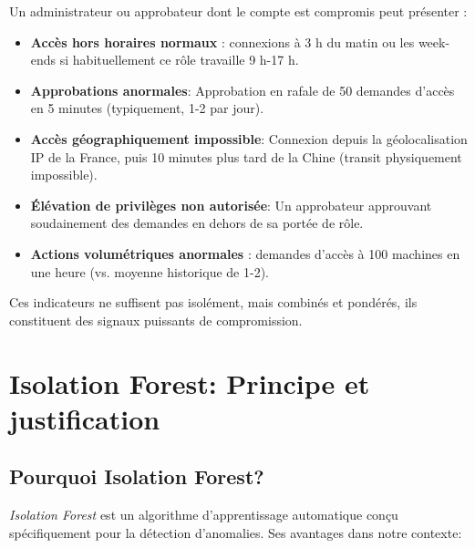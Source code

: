 Un administrateur ou approbateur dont le compte est compromis peut présenter :

\begin{itemize}
	\item \textbf{Accès hors horaires normaux} : connexions à 3 h du matin ou les week-ends si habituellement ce rôle travaille 9 h-17 h.
	
	\item \textbf{Approbations anormales}: Approbation en rafale de 50 demandes d'accès en 5 minutes (typiquement, 1-2 par jour).
	
	\item \textbf{Accès géographiquement impossible}: Connexion depuis la géolocalisation IP de la France, puis 10 minutes plus tard de la Chine (transit physiquement impossible).
	
	\item \textbf{Élévation de privilèges non autorisée}: Un approbateur approuvant soudainement des demandes en dehors de sa portée de rôle.
	
	\item \textbf{Actions volumétriques anormales} : demandes d'accès à 100 machines en une heure (vs. moyenne historique de 1-2).
\end{itemize}

Ces indicateurs ne suffisent pas isolément, mais combinés et pondérés, ils constituent des signaux puissants de compromission.

\section{Isolation Forest: Principe et justification}

\subsection{Pourquoi Isolation Forest?}

\textit{Isolation Forest} est un algorithme d'apprentissage automatique conçu spécifiquement pour la détection d'anomalies. Ses avantages dans notre contexte:

